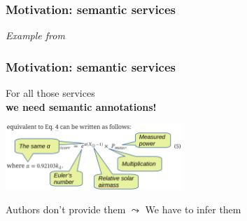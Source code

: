 \documentclass[aspectratio=169]{beamer}
\def\examplecite#1{{\textit{\color{black!60!blue}\small Example from \cite{#1}}}}
\begin{document}
\begin{frame}
    \frametitle{Motivation: semantic services}
    \hfill \examplecite{krisciunas2022including}\par
    \centering
\end{frame}


\begin{frame}
    \frametitle{Motivation: semantic services}
    \centering
    \Large
    For all those services\\
    {\bfseries we need semantic annotations!}\\
    \vspace{2em}\par
    \includegraphics[width=0.5\textwidth]{annos.png}
    \vspace{2em}\par
    \pause
    Authors don't provide them $\leadsto$ We have to infer them
\end{frame}
\end{document}

